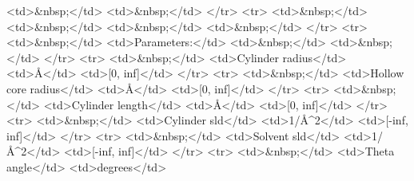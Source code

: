 \textless{}td\textgreater{}\&nbsp;\textless{}/td\textgreater{} \textless{}td\textgreater{}\&nbsp;\textless{}/td\textgreater{} \textless{}/tr\textgreater{} \textless{}tr\textgreater{} \textless{}td\textgreater{}\&nbsp;\textless{}/td\textgreater{} \textless{}td\textgreater{}\&nbsp;\textless{}/td\textgreater{} \textless{}td\textgreater{}\&nbsp;\textless{}/td\textgreater{} \textless{}td\textgreater{}\&nbsp;\textless{}/td\textgreater{} \textless{}/tr\textgreater{} \textless{}tr\textgreater{} \textless{}td\textgreater{}\&nbsp;\textless{}/td\textgreater{} \textless{}td\textgreater{}Parameters:\textless{}/td\textgreater{} \textless{}td\textgreater{}\&nbsp;\textless{}/td\textgreater{} \textless{}td\textgreater{}\&nbsp;\textless{}/td\textgreater{} \textless{}/tr\textgreater{} \textless{}tr\textgreater{} \textless{}td\textgreater{}\&nbsp;\textless{}/td\textgreater{} \textless{}td\textgreater{}Cylinder radius\textless{}/td\textgreater{} \textless{}td\textgreater{}\AA{}\textless{}/td\textgreater{} \textless{}td\textgreater{}[0, inf]\textless{}/td\textgreater{} \textless{}/tr\textgreater{} \textless{}tr\textgreater{} \textless{}td\textgreater{}\&nbsp;\textless{}/td\textgreater{} \textless{}td\textgreater{}Hollow core radius\textless{}/td\textgreater{} \textless{}td\textgreater{}\AA{}\textless{}/td\textgreater{} \textless{}td\textgreater{}[0, inf]\textless{}/td\textgreater{} \textless{}/tr\textgreater{} \textless{}tr\textgreater{} \textless{}td\textgreater{}\&nbsp;\textless{}/td\textgreater{} \textless{}td\textgreater{}Cylinder length\textless{}/td\textgreater{} \textless{}td\textgreater{}\AA{}\textless{}/td\textgreater{} \textless{}td\textgreater{}[0, inf]\textless{}/td\textgreater{} \textless{}/tr\textgreater{} \textless{}tr\textgreater{} \textless{}td\textgreater{}\&nbsp;\textless{}/td\textgreater{} \textless{}td\textgreater{}Cylinder sld\textless{}/td\textgreater{} \textless{}td\textgreater{}1/\AA{}\textasciicircum{}2\textless{}/td\textgreater{} \textless{}td\textgreater{}[-inf, inf]\textless{}/td\textgreater{} \textless{}/tr\textgreater{} \textless{}tr\textgreater{} \textless{}td\textgreater{}\&nbsp;\textless{}/td\textgreater{} \textless{}td\textgreater{}Solvent sld\textless{}/td\textgreater{} \textless{}td\textgreater{}1/\AA{}\textasciicircum{}2\textless{}/td\textgreater{} \textless{}td\textgreater{}[-inf, inf]\textless{}/td\textgreater{} \textless{}/tr\textgreater{} \textless{}tr\textgreater{} \textless{}td\textgreater{}\&nbsp;\textless{}/td\textgreater{} \textless{}td\textgreater{}Theta angle\textless{}/td\textgreater{} \textless{}td\textgreater{}degrees\textless{}/td\textgreater{}

